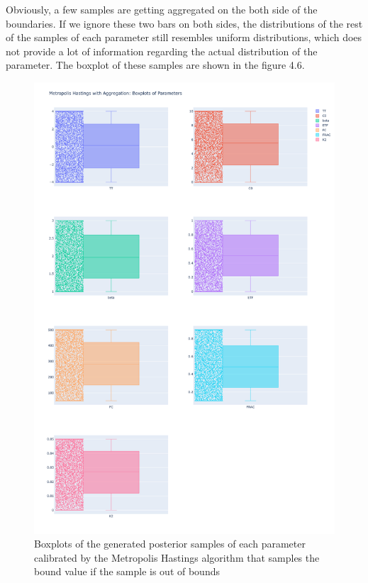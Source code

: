 Obviously, a few samples are getting aggregated on the both side of the boundaries. If we ignore these two bars on both sides, the distributions of the rest of the samples of each parameter still resembles uniform distributions, which does not provide a lot of information regarding the actual distribution of the parameter. The boxplot of these samples are shown in the figure 4.6.

\begin{figure}
    \centering
    \includegraphics[width=1\textwidth]{figures/basic_mh/aggr_mh/aggr_mh_boxplot.png}
    \captionsetup{width=.8\textwidth}
    \caption{Boxplots of the generated posterior samples of each parameter
calibrated by the Metropolis Hastings algorithm that samples the bound value if the sample is out of bounds}
    \label{fig:enter-label}
\end{figure}

